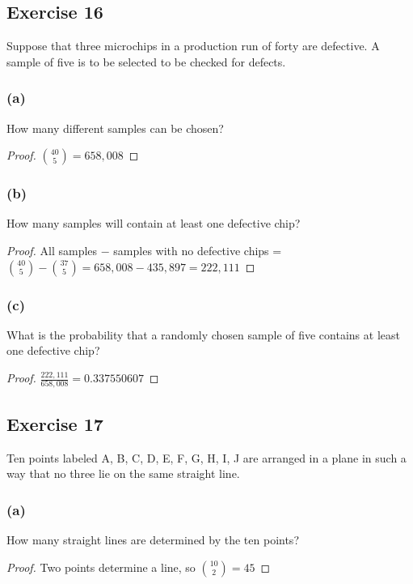 \documentclass[14pt]{extarticle}
\begin{document}
\subsection{Exercise 16}
Suppose that three microchips in a production run of forty are defective. A sample of five is to be selected to be checked 
for defects.

\subsubsection{(a)}
How many different samples can be chosen?

\begin{proof}
\(\binom{40}{5} = 658,008\)
\end{proof}

\subsubsection{(b)}
How many samples will contain at least one defective chip?

\begin{proof}
All samples \(-\) samples with no defective chips = \(\binom{40}{5} - \binom{37}{5} = 658,008 - 435,897 = 222,111\)
\end{proof}

\subsubsection{(c)}
What is the probability that a randomly chosen sample of five contains at least one defective chip?

\begin{proof}
\(\frac{222,111}{658,008} = 0.337550607\)
\end{proof}

\subsection{Exercise 17}
Ten points labeled A, B, C, D, E, F, G, H, I, J are arranged in a plane in such a way that no three lie on the same 
straight line.

\subsubsection{(a)}
How many straight lines are determined by the ten points?

\begin{proof}
Two points determine a line, so \(\binom{10}{2} = 45\)
\end{proof}
\end{document}
